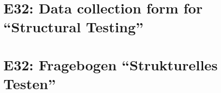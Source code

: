 
\thispagestyle{empty}
\ifenglish
\section*{E32: Data collection form for ``Structural Testing''}

\fi
\ifgerman
\section*{E32: Fragebogen "`Strukturelles Testen"'}

\fi

